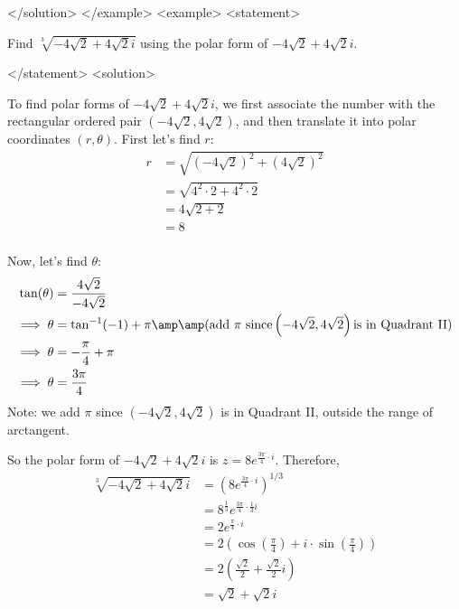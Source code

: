       </solution>
    </example>
    <example>
      <statement>
        
          Find $\sqrt[3]{-4\sqrt{2}+4\sqrt{2}i}$ using the polar form of $-4\sqrt{2}+4\sqrt{2}i$.
        
      </statement>
      <solution>
        
          To find polar forms of $-4\sqrt{2}+4\sqrt{2}i$, we first associate the number with the rectangular ordered pair $\left( -4\sqrt{2},4\sqrt{2} \right)$, and then translate it into polar coordinates $\left( r,\theta \right)$. First let's find $r$:
            \begin{align*}
              r &= \sqrt{\left( -4\sqrt{2} \right) ^2+ \left( 4\sqrt{2} \right) ^2} \\
               &= \sqrt{4^2 \cdot 2 + 4^2 \cdot 2} \\
               &=4 \sqrt{2+2} \\
               &=8 \\
            \end{align*}
        
        
          Now, let's find $\theta$:
          \begin{align*}
            \tan(\theta) &= \frac{4\sqrt{2}}{-4\sqrt{2}} \\
             \implies \theta &= \tan^{-1}(-1)+\pi \amp\amp \text{(add } \pi \text{ since} \left( -4\sqrt{2},4\sqrt{2} \right) \text{is in Quadrant II)}\\
             \implies \theta &= -\frac{\pi}{4}+\pi \\
             \implies \theta &= \frac{3\pi}{4} \\
          \end{align*}
          Note: we add $\pi$ since $\left( -4\sqrt{2},4\sqrt{2} \right)$ is in Quadrant II, outside the range of arctangent.
        
        
          So the polar form of $-4\sqrt{2}+4\sqrt{2}i$ is $z=8e^{\frac{3\pi}{4} \cdot i}$. Therefore,
          \begin{align*}
            \sqrt[3]{-4\sqrt{2}+4\sqrt{2}i} &= \left( 8e^{\frac{3\pi}{4} \cdot i} \right) ^{1/3} \\
             &=8^{\frac{1}{3}}e^{\frac{3\pi}{4} \cdot \frac{1}{3}i} \\
             &=2e^{\frac{\pi}{4} \cdot i} \\
             &=2 \left( \cos \left( \frac{\pi}{4} \right)+i \cdot \sin \left( \frac{\pi}{4} \right)\right)\\
             &=2 \left( \frac{\sqrt{2}}{2}+\frac{\sqrt{2}}{2}i \right)\\
             &=\sqrt{2}+\sqrt{2}i \\
          \end{align*}
        
